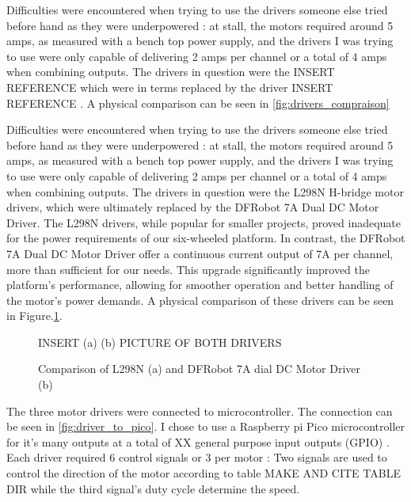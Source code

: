 \documentclass[11pt]{article}
\begin{document}
                Difficulties were encountered when trying to use the drivers someone else tried before hand as they were underpowered : at stall, the motors required around 5 amps, as measured with a bench top power supply, and the drivers I was trying to use were only capable of delivering 2 amps per channel or a total of 4 amps when combining outputs. The drivers in question were the \color{red} INSERT REFERENCE \color{black} which were in terms replaced by the driver \color{red} INSERT REFERENCE \color{black}. A physical comparison can be seen in \ref{fig:drivers_compraison}
                
                Difficulties were encountered when trying to use the drivers someone else tried before hand as they were underpowered : at stall, the motors required around 5 amps, as measured with a bench top power supply, and the drivers I was trying to use were only capable of delivering 2 amps per channel or a total of 4 amps when combining outputs. The drivers in question were the L298N H-bridge motor drivers, which were ultimately replaced by the DFRobot 7A Dual DC Motor Driver. The L298N drivers, while popular for smaller projects, proved inadequate for the power requirements of our six-wheeled platform. In contrast, the DFRobot 7A Dual DC Motor Driver offer a continuous current output of 7A per channel, more than sufficient for our needs. This upgrade significantly improved the platform's performance, allowing for smoother operation and better handling of the motor's power demands. A physical comparison of these drivers can be seen in Figure.\ref{fig:drivers_comparison}.

                
                \begin{figure}[h]
                    \centering
                    INSERT (a) (b) PICTURE OF BOTH DRIVERS
                    \caption{Comparison of L298N (a) and DFRobot 7A dial DC Motor Driver (b)}
                    \label{fig:drivers_comparison}
                \end{figure}

                The three motor drivers were connected to microcontroller. The connection can be seen in \ref{fig:driver_to_pico}.
                I chose to use a Raspberry pi Pico microcontroller for it's many outputs at a total of \color{red} XX general purpose input outputs (GPIO) \color{black}. Each driver required 6 control signals or 3 per motor : Two signals are used to control the direction of the motor according to table \color{red} MAKE AND CITE TABLE DIR \color{black} while the third signal's duty cycle determine the speed.
\end{document}
